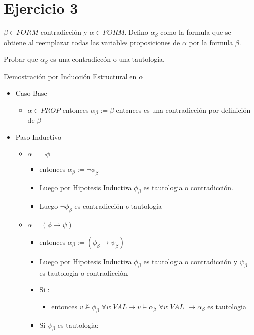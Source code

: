 \documentclass[14pt,a4paper,fleqn]{article}
\newcommand{\implica}[2]{(#1 \rightarrow #2)}
\newcommand{\entonces}{\rightarrow}
\newcommand{\no}[1]{\neg #1}
\newcommand{\satisface}{\vDash}
\newcommand{\nosatisf}{\nvDash}
\begin{document}
\section*{Ejercicio 3}

$\beta \in FORM$ contradicción y $\alpha \in FORM$. Defino $\alpha_{\beta}$ como la formula que se obtiene al reemplazar todas las variables proposiciones de $\alpha$ por la formula $\beta$.

Probar que $\alpha_{\beta}$ es una contradiccón o una tautologia.

Demostración por Inducción Estructural en $\alpha$ 

\begin{itemize}
	\item Caso Base
	\begin{itemize}
		\item $\alpha \in PROP$ entonces $\alpha_{\beta} := \beta$ entonces es una contradicción por definición de $\beta$
	\end{itemize}
	\item Paso Inductivo
	\begin{itemize}
		\item $\alpha = \no{\phi}$ 
		\begin{itemize}
			\item entonces $\alpha_{\beta} := \no{\phi_{\beta}}$ 
			\item Luego por Hipotesis Inductiva $\phi_{\beta}$ es tautologia o contradicción. 
			\item Luego $\no{\phi_{\beta}}$ es contradicción o tautologia
		\end{itemize}
		\item $\alpha = \implica \phi \psi$
		\begin{itemize}
			\item entonces $\alpha_{\beta} := \implica{\phi_{\beta}}{\psi_{\beta}}$ 
			\item Luego por Hipotesis Inductiva $\phi_{\beta}$ es tautologia o contradicción y $\psi_{\beta}$ es tautologia o contradicción. 
			\item Si :
			\begin{itemize}
				 \item entonces $v \nosatisf \phi_{\beta}$ $\forall v: VAL \entonces v \satisface \alpha_{\beta}$ $\forall v:VAL$ $ \entonces  \alpha_{\beta}$ es tautologia 
			\end{itemize}
			\item Si $\psi_{\beta}$ es tautologia:
			\begin{itemize}

\end{itemize}
\end{itemize}
\end{itemize}
\end{itemize}
\end{document}
